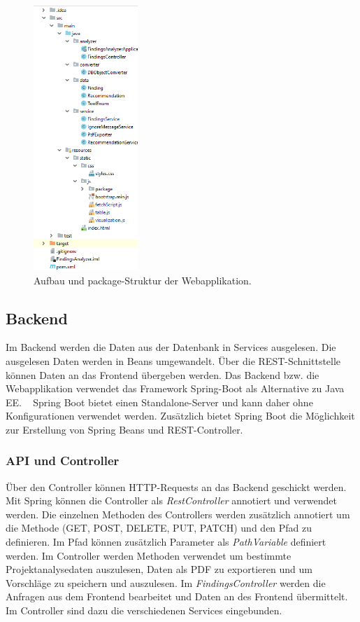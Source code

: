 \begin{figure}[tp]
  \centering
  \includegraphics[height=10cm]{images/structure.PNG}
 \caption[Aufbau und package-Struktur der Webapplikation.]{Aufbau und package-Struktur der Webapplikation.}
  \label{fig:structure}
\end{figure}

\subsection{Backend}
Im Backend werden die Daten aus der Datenbank in Services ausgelesen. Die ausgelesen Daten werden in Beans umgewandelt. Über die REST-Schnittstelle können Daten an das Frontend übergeben werden. Das Backend bzw. die Webapplikation verwendet das Framework Spring-Boot als Alternative zu Java EE. ~\parencite{walls2016spring} Spring Boot bietet einen Standalone-Server und kann daher ohne Konfigurationen verwendet werden. Zusätzlich bietet Spring Boot die Möglichkeit zur Erstellung von Spring Beans und REST-Controller.  

\subsubsection{API und Controller}
Über den Controller können HTTP-Requests an das Backend geschickt werden. Mit Spring können die Controller als \textit{RestController} annotiert und verwendet werden. Die einzelnen Methoden des Controllers werden zusätzlich annotiert um die Methode (GET, POST, DELETE, PUT, PATCH) und den Pfad zu definieren. Im Pfad können zusätzlich Parameter als \textit{PathVariable} definiert werden. Im Controller werden  Methoden verwendet um bestimmte Projektanalysedaten auszulesen, Daten als PDF zu exportieren und um Vorschläge zu speichern und auszulesen. Im \textit{FindingsController} werden die Anfragen aus dem Frontend bearbeitet und Daten an des Frontend übermittelt. Im Controller sind dazu die verschiedenen Services eingebunden.

